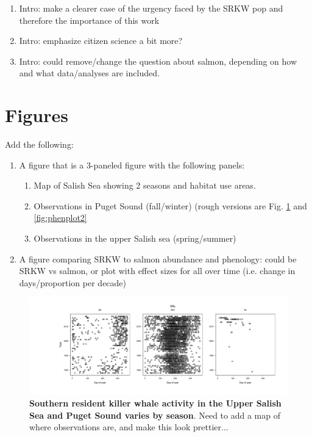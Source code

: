 \documentclass{article}
\begin{document}
\begin{enumerate}
\item Intro: make a clearer case of the urgency faced by the SRKW pop and therefore the importance of this work
\item Intro: emphasize citizen science a bit more?
\item Intro: could remove/change the question about salmon, depending on how and what data/analyses are included.
\end{enumerate}

\section* {Figures}
Add the following:
\begin{enumerate}
\item A figure that is a 3-paneled figure with the following panels: 
\begin{enumerate}
\item Map of Salish Sea showing 2 seasons and habitat use areas.
\item Observations in Puget Sound (fall/winter) (rough versions are Fig. \ref{fig:phenplot} and \ref{fig:phenplot2}
\item Observations in the upper Salish sea (spring/summer)
\end{enumerate}
\item A figure comparing SRKW to salmon abundance and phenology: could be SRKW vs salmon, or plot with effect sizes for all over time (i.e. change in days/proportion per decade)
\end{enumerate}

\begin{figure}[p]
\includegraphics{../analyses/figures/OrcaPhenPlots/SRKW_yr_doy.pdf} 
\caption{\textbf{Southern resident killer whale activity in the Upper Salish Sea and Puget Sound varies by season}. Need to add a map of where observations are, and make this look prettier...}
 \label{fig:phenplot}
 \end{figure}
 
\end{document}
